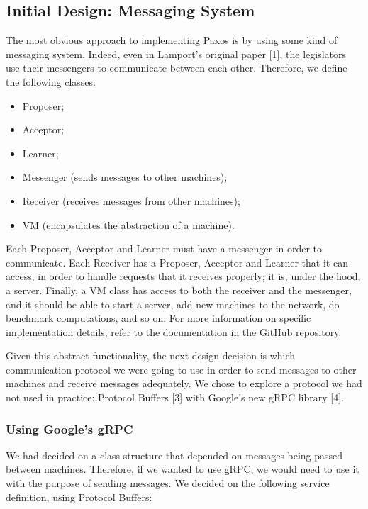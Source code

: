 \documentclass[12pt,]{article}
\providecommand{\tightlist}{%
  \setlength{\itemsep}{0pt}\setlength{\parskip}{0pt}}
\begin{document}
\subsection{Initial Design: Messaging
System}\label{initial-design-messaging-system}

The most obvious approach to implementing Paxos is by using some kind of
messaging system. Indeed, even in Lamport's original paper {[}1{]}, the
legislators use their messengers to communicate between each other.
Therefore, we define the following classes:

\begin{itemize}
\tightlist
\item
  Proposer;
\item
  Acceptor;
\item
  Learner;
\item
  Messenger (sends messages to other machines);
\item
  Receiver (receives messages from other machines);
\item
  VM (encapsulates the abstraction of a machine).
\end{itemize}

Each Proposer, Acceptor and Learner must have a messenger in order to
communicate. Each Receiver has a Proposer, Acceptor and Learner that it
can access, in order to handle requests that it receives properly; it
is, under the hood, a server. Finally, a VM class has access to both the
receiver and the messenger, and it should be able to start a server, add
new machines to the network, do benchmark computations, and so on. For
more information on specific implementation details, refer to the
documentation in the GitHub repository.

Given this abstract functionality, the next design decision is which
communication protocol we were going to use in order to send messages to
other machines and receive messages adequately. We chose to explore a
protocol we had not used in practice: Protocol Buffers {[}3{]} with
Google's new gRPC library {[}4{]}.

\subsubsection{Using Google's gRPC}\label{using-googles-grpc}

We had decided on a class structure that depended on messages being
passed between machines. Therefore, if we wanted to use gRPC, we would
need to use it with the purpose of sending messages. We decided on the
following service definition, using Protocol Buffers:
\end{document}
